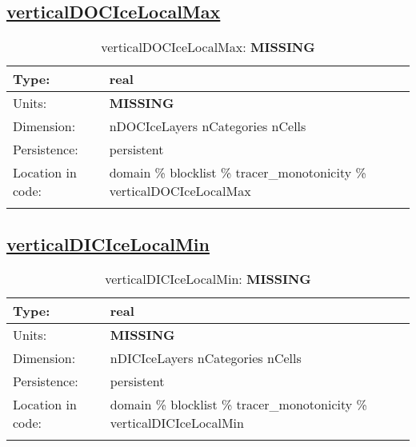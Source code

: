 \subsection[verticalDOCIceLocalMax]{\hyperref[sec:var_tab_tracer_monotonicity]{verticalDOCIceLocalMax}}
\label{subsec:var_sec_tracer_monotonicity_verticalDOCIceLocalMax}
\begin{center}
\begin{longtable}{| p{2.0in} | p{4.0in} |}
        \hline 
        Type: & real \\
        \hline 
        Units: & {\bf \color{red} MISSING} \\
        \hline 
        Dimension: & nDOCIceLayers nCategories nCells \\
        \hline 
        Persistence: & persistent \\
        \hline 
         Location in code: & domain \% blocklist \% tracer\_monotonicity \% verticalDOCIceLocalMax \\
         \hline 
    \caption{verticalDOCIceLocalMax: {\bf \color{red} MISSING}}
\end{longtable}
\end{center}
\subsection[verticalDICIceLocalMin]{\hyperref[sec:var_tab_tracer_monotonicity]{verticalDICIceLocalMin}}
\label{subsec:var_sec_tracer_monotonicity_verticalDICIceLocalMin}
\begin{center}
\begin{longtable}{| p{2.0in} | p{4.0in} |}
        \hline 
        Type: & real \\
        \hline 
        Units: & {\bf \color{red} MISSING} \\
        \hline 
        Dimension: & nDICIceLayers nCategories nCells \\
        \hline 
        Persistence: & persistent \\
        \hline 
         Location in code: & domain \% blocklist \% tracer\_monotonicity \% verticalDICIceLocalMin \\
         \hline 
    \caption{verticalDICIceLocalMin: {\bf \color{red} MISSING}}
\end{longtable}
\end{center}
